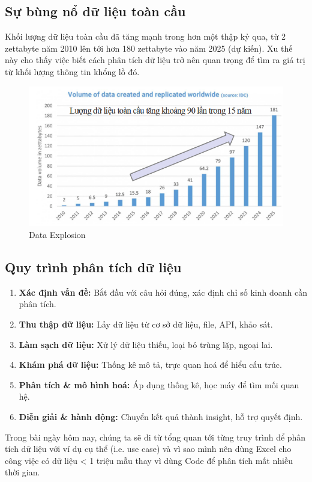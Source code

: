 \documentclass[11pt]{article}
\begin{document}
\subsection{Sự bùng nổ dữ liệu toàn cầu}
Khối lượng dữ liệu toàn cầu đã tăng mạnh trong hơn một thập kỷ qua, từ 2 zettabyte năm 2010 lên tới hơn 180 zettabyte vào năm 2025 (dự kiến). Xu thế này cho thấy việc biết cách phân tích dữ liệu trở nên quan trọng để tìm ra giá trị từ khối lượng thông tin khổng lồ đó.

\begin{figure}[H]
    \centering
    \includegraphics[width=1\linewidth]{images/dataExplosion.png}
    \caption{Data Explosion}
    \label{fig:dataExplosion}
\end{figure}

\subsection{Quy trình phân tích dữ liệu}
\begin{enumerate}
    \item \textbf{Xác định vấn đề:} Bắt đầu với câu hỏi đúng, xác định chỉ số kinh doanh cần phân tích.
    \item \textbf{Thu thập dữ liệu:} Lấy dữ liệu từ cơ sở dữ liệu, file, API, khảo sát.
    \item \textbf{Làm sạch dữ liệu:} Xử lý dữ liệu thiếu, loại bỏ trùng lặp, ngoại lai.
    \item \textbf{Khám phá dữ liệu:} Thống kê mô tả, trực quan hoá để hiểu cấu trúc.
    \item \textbf{Phân tích \& mô hình hoá:} Áp dụng thống kê, học máy để tìm mối quan hệ.
    \item \textbf{Diễn giải \& hành động:} Chuyển kết quả thành insight, hỗ trợ quyết định.
\end{enumerate}
Trong bài ngày hôm nay, chúng ta sẽ đi từ tổng quan tới từng truy trình để phân tích dữ liệu với ví dụ cụ thể (i.e. use case) và vì sao mình nên dùng Excel cho công việc có dữ liệu < 1 triệu mẫu thay vì dùng Code để phân tích mất nhiều thời gian.
\end{document}
